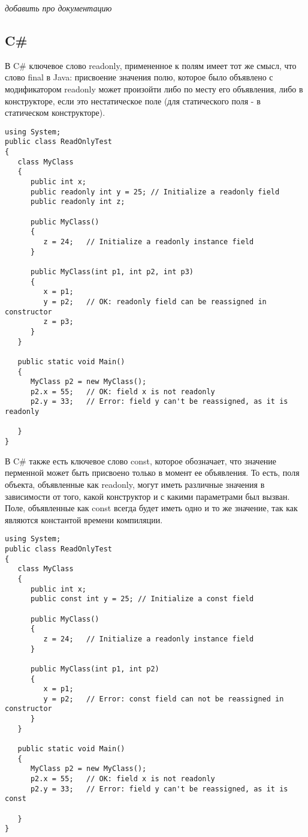 \textit{добавить про документацию}

\subsection{C\#}

В C\# ключевое слово readonly, примененное к полям имеет тот же смысл, что слово final в Java: присвоение значения полю, которое было объявлено с модификатором readonly может произойти либо по месту его объявления, либо в конструкторе, если это нестатическое поле (для статического поля - в статическом конструкторе). 

\begin{lstlisting}[caption=Ключевое слово readonly, label=code:csharp_readonly]
using System;
public class ReadOnlyTest 
{
   class MyClass 
   {
      public int x;
      public readonly int y = 25; // Initialize a readonly field
      public readonly int z;

      public MyClass() 
      {
         z = 24;   // Initialize a readonly instance field
      }

      public MyClass(int p1, int p2, int p3) 
      {
         x = p1; 
         y = p2;   // OK: readonly field can be reassigned in constructor
         z = p3;
      }
   }

   public static void Main() 
   {        
      MyClass p2 = new MyClass();
      p2.x = 55;   // OK: field x is not readonly
      p2.y = 33;   // Error: field y can't be reassigned, as it is readonly
      
   }
}	
\end{lstlisting}

В C\# также есть ключевое слово const, которое обозначает, что значение перменной может быть присвоено только в момент ее объявления. То есть, поля объекта, объявленные как readonly, могут иметь различные значения в зависимости от того, какой конструктор и с какими параметрами был вызван. Поле, объявленные как const всегда будет иметь одно и то же значение, так как являются константой времени компиляции.

\begin{lstlisting}[caption=Ключевое слово const, label=code:csharp_const]
using System;
public class ReadOnlyTest 
{
   class MyClass 
   {
      public int x;
      public const int y = 25; // Initialize a const field

      public MyClass() 
      {
         z = 24;   // Initialize a readonly instance field
      }

      public MyClass(int p1, int p2) 
      {
         x = p1; 
         y = p2;   // Error: const field can not be reassigned in constructor        
      }
   }

   public static void Main() 
   {        
      MyClass p2 = new MyClass();
      p2.x = 55;   // OK: field x is not readonly
      p2.y = 33;   // Error: field y can't be reassigned, as it is const
      
   }
}	
\end{lstlisting}

